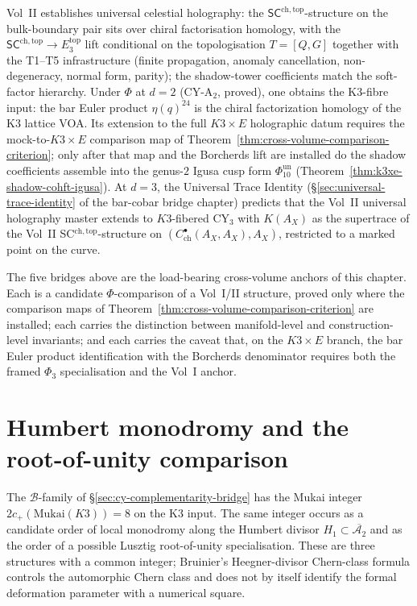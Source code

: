 \begin{remark}
\label{rem:modular-koszul-bridge-vol2-holography}
Vol~II \cite{VolII} establishes universal celestial holography:
the $\mathsf{SC}^{\mathrm{ch,top}}$-structure on the bulk-boundary
pair sits over chiral factorisation homology, with the
$\mathsf{SC}^{\mathrm{ch,top}} \to E_3^{\mathrm{top}}$ lift conditional
on the topologisation $T = [Q, G]$ together with the T1--T5
infrastructure (finite propagation, anomaly cancellation,
non-degeneracy, normal form, parity); the shadow-tower coefficients
match the soft-factor hierarchy. Under $\Phi$ at $d = 2$ \textup{(}CY-A$_2$, proved\textup{),} one obtains the K3-fibre input: the bar Euler product $\eta(q)^{24}$ is the chiral factorization homology of the K3 lattice VOA. Its extension to the full $K3 \times E$ holographic datum requires the mock-to-$K3\times E$ comparison map of Theorem~\ref{thm:cross-volume-comparison-criterion}; only after that map and the Borcherds lift are installed do the shadow coefficients assemble into the genus-$2$ Igusa cusp form $\Phi_{10}^{\mathrm{un}}$ \textup{(}Theorem~\ref{thm:k3xe-shadow-cohft-igusa}\textup{).} At $d = 3$, the Universal Trace Identity \textup{(}\S\ref{sec:universal-trace-identity} of the bar-cobar bridge chapter\textup{)} predicts that the Vol~II universal holography master extends to $K3$-fibered CY$_3$ with $K(A_X)$ as the supertrace of the Vol~II SC$^{\mathrm{ch,top}}$-structure on $(C^\bullet_{\mathrm{ch}}(A_X, A_X), A_X)$, restricted to a marked point on the curve.
\end{remark}

\noindent The five bridges above are the load-bearing cross-volume anchors
of this chapter. Each is a candidate \(\Phi\)-comparison of a Vol~I/II
structure, proved only where the comparison maps of
Theorem~\ref{thm:cross-volume-comparison-criterion} are installed; each
carries the distinction between manifold-level and construction-level
invariants; and each carries the caveat that, on the $K3\times E$
branch, the bar Euler product identification with the Borcherds
denominator requires both the framed $\Phi_3$ specialisation and the
Vol~I anchor.


\section{Humbert monodromy and the root-of-unity comparison}
\label{sec:modular-koszul-humbert-identity}

The $\mathcal{B}$-family of \S\ref{sec:cy-complementarity-bridge} has the Mukai integer $2c_+(\mathrm{Mukai}(K3))=8$ on the K3 input. The same integer occurs as a candidate order of local monodromy along the Humbert divisor $H_1\subset\overline{\mathcal{A}_2}$ and as the order of a possible Lusztig root-of-unity specialisation. These are three structures with a common integer; Bruinier's Heegner-divisor Chern-class formula controls the automorphic Chern class and does not by itself identify the formal deformation parameter with a numerical square.

